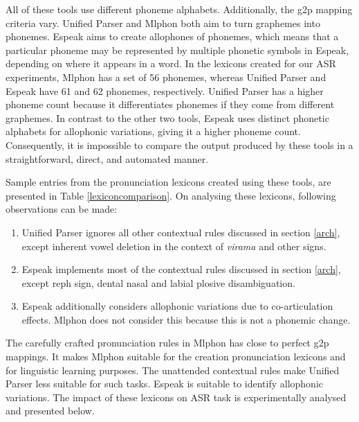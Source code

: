 \documentclass{ieeeaccess}
\begin{document}
All of these tools use different phoneme alphabets. Additionally, the g2p mapping criteria vary. Unified Parser and Mlphon both aim to turn graphemes into phonemes. Espeak aims to create allophones of phonemes, which means that a particular phoneme may be represented by multiple phonetic symbols in Espeak, depending on where it appears in a word.  In the lexicons created for our ASR experiments, Mlphon has a set of 56 phonemes, whereas Unified Parser and Espeak have 61 and 62 phonemes, respectively. Unified Parser has a higher phoneme count because it differentiates  phonemes if they come from different graphemes. In contrast to the other two tools, Espeak uses distinct phonetic alphabets for allophonic variations, giving it a higher phoneme count.  Consequently, it is impossible to compare the output produced by these tools in a straightforward, direct, and automated manner.

Sample entries from the pronunciation lexicons created using these tools, are presented in Table \ref{lexiconcomparison}. On analysing these lexicons, following observations can be made:

\begin{enumerate}
    \item Unified Parser ignores all other contextual rules discussed in section \ref{arch}, except inherent vowel deletion in the context of \textit{virama} and other signs.
    \item Espeak implements most of the contextual rules discussed in section \ref{arch}, except reph sign, dental nasal and labial plosive disambiguation.
    \item Espeak additionally considers allophonic variations due to co-articulation effects. Mlphon does not consider this because this is not a phonemic change.
\end{enumerate}

The carefully crafted pronunciation rules in Mlphon has close to perfect g2p mappings. It makes Mlphon suitable for the creation pronunciation lexicons and for linguistic learning purposes. The unattended contextual rules make Unified Parser less suitable for such tasks. Espeak is suitable to identify allophonic variations. The impact of these lexicons on ASR task is experimentally analysed and presented below.
\end{document}
